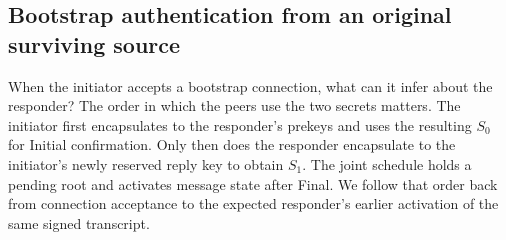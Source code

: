 \subsection{Bootstrap authentication from an original surviving source}
\label{sec:bootstrap-authentication}

When the initiator accepts a bootstrap connection, what can it infer
about the responder? The order in which the peers use the two secrets
matters. The initiator first encapsulates to the responder's prekeys
and uses the resulting $S_0$ for Initial confirmation. Only then does
the responder encapsulate to the initiator's newly reserved reply key
to obtain $S_1$. The joint schedule holds a pending root and activates
message state after Final. We follow that order back from connection
acceptance to the expected responder's earlier activation of the same
signed transcript.

